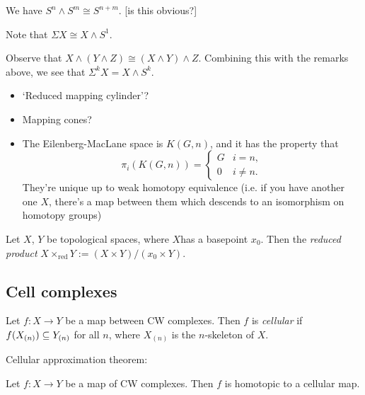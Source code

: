 \documentclass{MetricNotes2023}
\def\subq{\ensuremath\subseteq}
\begin{document}
\begin{example}
We have \(S^n \wedge S^m\cong S^{n+m}\). [is this obvious?]
\end{example}

\begin{remark}
Note that \(\Sigma X \cong X\wedge S^1\). 
\end{remark}

\begin{remark}
Observe that \(X\wedge (Y\wedge Z)\cong (X\wedge Y)\wedge Z\). Combining this with the remarks above, we see that \(\Sigma^kX=X\wedge S^k\). 
\end{remark}

\begin{itemize}
\item `Reduced mapping cylinder'?
\item Mapping cones?
\item The Eilenberg-MacLane space is \(K(G, n)\), and it has the property that 
\[\pi_i(K(G, n))=\begin{cases}
G & i=n,\\
0 & i\neq n.
\end{cases}\]
They're unique up to weak homotopy equivalence (i.e. if you have another one \(X\), there's a map between them which descends to an isomorphism on homotopy groups)
\end{itemize}

\begin{definition}
Let \(X\), \(Y\) be topological spaces, where \(X\)has a basepoint \(x_0\). Then the \textit{reduced product} \(X\times_{\text{red}}Y:=(X\times Y)/(x_0 \times Y)\). 
\end{definition}

\subsection{Cell complexes}\label{2502141508}

\begin{definition}
Let \(f : X \to Y\) be a map between CW complexes. Then \(f\) is \textit{cellular} if \(f(X_{(n)})\subq Y_{(n)}\) for all \(n\), where \(X_{(n)}\) is the \(n\)-skeleton of \(X\). 
\end{definition}

Cellular approximation theorem:

\begin{theorem} 
Let \(f : X \to Y\) be a map of CW complexes. Then \(f\) is homotopic to a cellular map.
\end{theorem}
\end{document}
